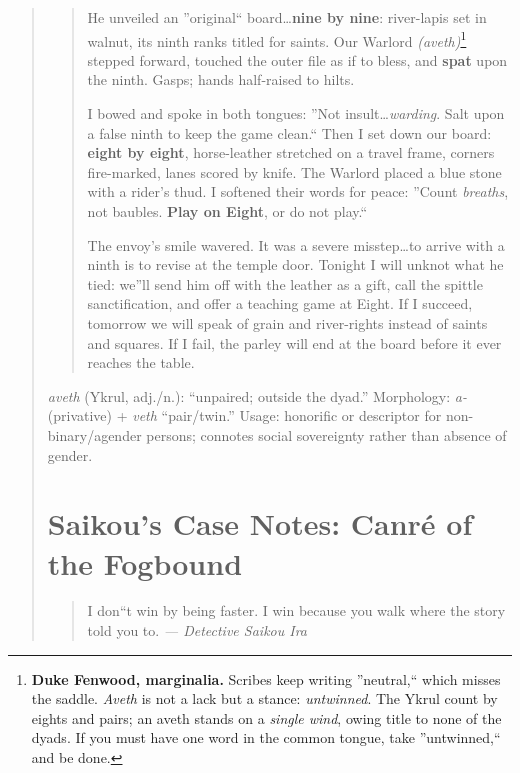 \documentclass[11pt]{article}
\begin{document}
\begin{quote}
\begin{quote}
He unveiled an ''original`` board\dots \textbf{nine by nine}: river-lapis set in walnut, its ninth ranks titled for saints. 
Our Warlord \textit{(aveth)}\footnote{\textbf{Duke Fenwood, marginalia.} 
Scribes keep writing ''neutral,`` which misses the saddle. \textit{Aveth} is not a lack but a stance: \emph{untwinned}. 
The Ykrul count by eights and pairs; an aveth stands on a \emph{single wind}, owing title to none of the dyads. If you must have one word in the common tongue, take ''untwinned,`` and be done.} stepped forward, touched the outer file as if to bless, and \textbf{spat} upon the ninth. Gasps; hands half-raised to hilts.

I bowed and spoke in both tongues: ''Not insult\dots \emph{warding}. Salt upon a false ninth to keep the game clean.`` 
Then I set down our board: \textbf{eight by eight}, horse-leather stretched on a travel frame, corners fire-marked, lanes scored by knife. 
The Warlord placed a blue stone with a rider's thud. I softened their words for peace: ''Count \emph{breaths}, not baubles. \textbf{Play on Eight}, or do not play.``

The envoy's smile wavered. It was a severe misstep\dots to arrive with a ninth is to revise at the temple door. 
Tonight I will unknot what he tied: we''ll send him off with the leather as a gift, call the spittle sanctification, and offer a teaching game at Eight. 
If I succeed, tomorrow we will speak of grain and river-rights instead of saints and squares. 
If I fail, the parley will end at the board before it ever reaches the table.
\end{quote}

\medskip
\noindent\textit{aveth} (Ykrul, adj./n.): ``unpaired; outside the dyad.'' 
Morphology: \textit{a-} (privative) + \textit{veth} ``pair/twin.'' 
Usage: honorific or descriptor for non-binary/agender persons; connotes social sovereignty rather than absence of gender.

\section{Saikou's Case Notes: Canré of the Fogbound}
\label{sec:saikou-manual}

\begin{quote}\small
I don``t win by being faster. I win because you walk where the story told you to. \textit{--- Detective Saikou Ira}
\end{quote}


\end{quote}
\end{document}
